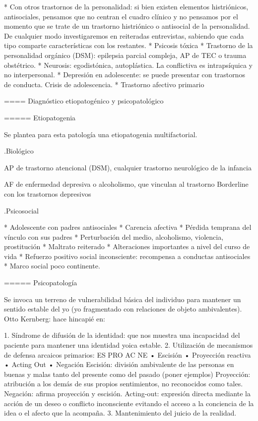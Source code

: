 * Con otros trastornos de la personalidad: si bien existen elementos histriónicos, antisociales, pensamos que no centran el cuadro clínico y no pensamos por el momento que se trate de un trastorno histriónico o antisocial de la personalidad. De cualquier modo investigaremos en reiteradas entrevistas, sabiendo que cada tipo comparte características con los restantes.
* Psicosis tóxica
* Trastorno de la personalidad orgánico (DSM): epilepsia parcial compleja, AP de TEC o trauma obstétrico.
* Neurosis: egodistónica, autoplástica. La conflictiva es intrapsíquica y no interpersonal.
* Depresión en adolescente: se puede presentar con trastornos de conducta. Crisis de adolescencia.
* Trastorno afectivo primario

==== Diagnóstico etiopatogénico y psicopatológico

===== Etiopatogenia

Se plantea para esta patología una etiopatogenia multifactorial.

.Biológico

AP de trastorno atencional (DSM), cualquier trastorno neurológico de la infancia

AF de enfermedad depresiva o alcoholismo, que vinculan al trastorno Borderline con los trastornos depresivos

.Psicosocial

* Adolescente con padres antisociales
* Carencia afectiva
* Pérdida temprana del vínculo con sus padres
* Perturbación del medio, alcoholismo, violencia, prostitución
* Maltrato reiterado
* Alteraciones importantes a nivel del curso de vida
* Refuerzo positivo social inconsciente: recompensa a conductas antisociales
* Marco social poco continente.

===== Psicopatología

Se invoca un terreno de vulnerabilidad básica del individuo para mantener un sentido estable del yo (yo fragmentado con relaciones de objeto ambivalentes). Otto Kernberg: hace hincapié en:

1. Síndrome de difusión de la identidad: que nos muestra una incapacidad del paciente para mantener una identidad yoica estable.
2. Utilización de mecanismos de defensa arcaicos primarios: ES PRO AC NE • Escisión • Proyección reactiva • Acting Out • Negación Escisión: división ambivalente de las personas en buenas y malas tanto del presente como del pasado (poner ejemplos) Proyección: atribución a los demás de sus propios sentimientos, no reconocidos como tales. Negación: afirma proyección y escisión. Acting-out: expresión directa mediante la acción de un deseo o conflicto inconsciente evitando el acceso a la conciencia de la idea o el afecto que la acompaña.
3. Mantenimiento del juicio de la realidad.

